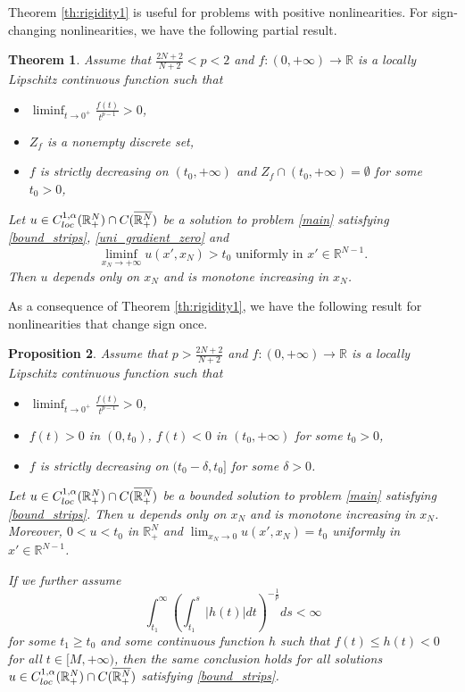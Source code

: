 \documentclass[reqno]{amsart}
\theoremstyle{plain}
\newtheorem{theorem}{Theorem}
\newtheorem{proposition}[theorem]{Proposition}
\theoremstyle{definition}
\theoremstyle{remark}
\begin{document}
	Theorem \eqref{th:rigidity1} is useful for problems with positive nonlinearities. For sign-changing nonlinearities, we have the following partial result.
	\begin{theorem}\label{th:rigidity2}
		Assume that $\frac{2N+2}{N+2} < p < 2$ and $f:(0,+\infty)\to\mathbb{R}$ is a locally Lipschitz continuous function such that
		\begin{itemize}
			\item[(i)] $\liminf_{t\to0^+} \frac{f(t)}{t^{p-1}} > 0$,
			\item[(ii)] $Z_f$ is a nonempty discrete set,
			\item[(iii)] $f$ is strictly decreasing on $(t_0,+\infty)$ and $Z_f\cap(t_0,+\infty)=\emptyset$ for some $t_0>0$,
		\end{itemize}
		Let $u \in C^{1,\alpha}_{\rm loc}(\mathbb{R}^N_+) \cap C(\overline{\mathbb{R}^N_+})$ be a solution to problem \eqref{main} satisfying \eqref{bound_strips}, \eqref{uni_gradient_zero} and
		\begin{equation}\label{uni_large}
			\liminf_{x_N\to+\infty} u(x', x_N) > t_0 \text{ uniformly in } x'\in\mathbb{R}^{N-1}.
		\end{equation}
		Then $u$ depends only on $x_N$ and is monotone increasing in $x_N$.
	\end{theorem}
	
	As a consequence of Theorem \ref{th:rigidity1}, we have the following result for nonlinearities that change sign once.
	\begin{proposition}\label{prop:rigidity}
		Assume that $p > \frac{2N+2}{N+2}$ and $f:(0,+\infty)\to\mathbb{R}$ is a locally Lipschitz continuous function such that
		\begin{itemize}
			\item[(i)] $\liminf_{t\to0^+} \frac{f(t)}{t^{p-1}} > 0$,
			\item[(ii)] $f(t) > 0$ in $(0,t_0)$, $f(t) < 0$ in $(t_0,+\infty)$ for some $t_0>0$,
			\item[(iii)] $f$ is strictly decreasing on $(t_0-\delta,t_0]$ for some $\delta>0$.
		\end{itemize}
		Let $u \in C^{1,\alpha}_{\rm loc}(\mathbb{R}^N_+) \cap C(\overline{\mathbb{R}^N_+})$ be a bounded solution to problem \eqref{main} satisfying \eqref{bound_strips}. Then $u$ depends only on $x_N$ and is monotone increasing in $x_N$. Moreover, $0<u<t_0$ in $\mathbb{R}^N_+$ and $\lim_{x_N\to0} u(x',x_N)= t_0$ uniformly in $x'\in\mathbb{R}^{N-1}$.
		
		If we further assume
		\begin{equation}\label{bounded_cond}
			\int_{t_1}^{\infty} \left(\int_{t_1}^{s}|h(t)|dt \right)^{-\frac{1}{p}} ds < \infty
		\end{equation}
		for some $t_1\ge t_0$ and some continuous function $h$ such that $f(t) \le h(t) < 0$ for all $t\in[M,+\infty)$, then the same conclusion holds for all solutions $u \in C^{1,\alpha}_{\rm loc}(\mathbb{R}^N_+) \cap C(\overline{\mathbb{R}^N_+})$ satisfying \eqref{bound_strips}.
	\end{proposition}
	
\end{document}
